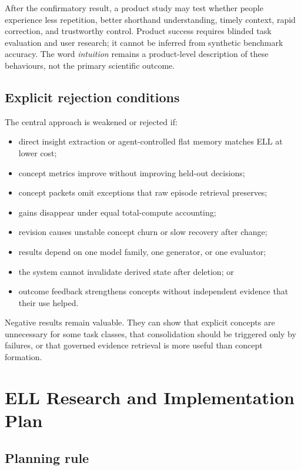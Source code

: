 \documentclass[
  english,
  a4paper,
  DIV=11,
  numbers=noendperiod]{scrreprt}
\providecommand{\tightlist}{%
  \setlength{\itemsep}{0pt}\setlength{\parskip}{0pt}}
\begin{document}
After the confirmatory result, a product study may test whether people
experience less repetition, better shorthand understanding, timely
context, rapid correction, and trustworthy control. Product success
requires blinded task evaluation and user research; it cannot be
inferred from synthetic benchmark accuracy. The word \emph{intuition}
remains a product-level description of these behaviours, not the primary
scientific outcome.

\section{Explicit rejection
conditions}\label{explicit-rejection-conditions}

The central approach is weakened or rejected if:

\begin{itemize}
\tightlist
\item
  direct insight extraction or agent-controlled flat memory matches ELL
  at lower cost;
\item
  concept metrics improve without improving held-out decisions;
\item
  concept packets omit exceptions that raw episode retrieval preserves;
\item
  gains disappear under equal total-compute accounting;
\item
  revision causes unstable concept churn or slow recovery after change;
\item
  results depend on one model family, one generator, or one evaluator;
\item
  the system cannot invalidate derived state after deletion; or
\item
  outcome feedback strengthens concepts without independent evidence
  that their use helped.
\end{itemize}

Negative results remain valuable. They can show that explicit concepts
are unnecessary for some task classes, that consolidation should be
triggered only by failures, or that governed evidence retrieval is more
useful than concept formation.


\chapter{ELL Research and Implementation
Plan}\label{ell-research-and-implementation-plan}

\section{Planning rule}\label{planning-rule}
\end{document}
